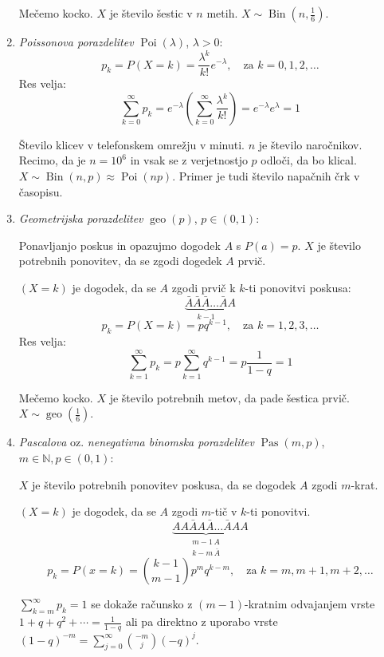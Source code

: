 \documentclass[12pt]{book}
\def\s{\vspace{10pt}}
\theoremstyle{definition}
\theoremstyle{plain}
\theoremstyle{plain}
\theoremstyle{plain}
\theoremstyle{remark}
\begin{document}
\begin{enumerate}
    \begin{zgled}
        Mečemo kocko. $X$ je število šestic v $n$ metih. $X \sim \operatorname{Bin}(n, \frac{1}{6})$.
    \end{zgled}
    \item \emph{Poissonova porazdelitev} $\operatorname{Poi}(\lambda)$, $\lambda > 0$:
    $$
    p_k=P(X=k)=\frac{\lambda^k}{k !} e^{-\lambda}, \quad \text{za } k=0,1,2, \ldots
    $$
    Res velja: 
    $$
    \sum_{k=0}^{\infty} p_k=e^{-\lambda} \left(\sum_{k=0}^{\infty} \frac{\lambda^k}{k !}\right)=e^{-\lambda} e^\lambda=1
    $$
    \begin{zgled}
        Število klicev v telefonskem omrežju v minuti. $n$ je število naročnikov. Recimo, da je $n=10^6$ in vsak se z verjetnostjo $p$ odloči, da bo klical. $X \sim \operatorname{Bin}(n,p)\approx \operatorname{Poi}(np)$. Primer je tudi število napačnih črk v časopisu. 
    \end{zgled}
    \item \emph{Geometrijska porazdelitev} $\operatorname{geo}(p)$, $p \in (0,1)$:
    
    Ponavljanjo poskus in opazujmo dogodek $A$ s $P(a) = p$. $X$ je število potrebnih ponovitev, da se zgodi dogedek $A$ prvič. 

    $(X=k)$ je dogodek, da se $A$ zgodi prvič k $k$-ti ponovitvi poskusa:
    $$
    \underbrace{\bar A\bar A\bar A \ldots \bar A}_{k-1}A
    $$
    $$
    p_k=P(X=k)=p  q^{k-1}, \quad \text{za }k=1, 2, 3, \ldots
    $$
    Res velja: 
    $$
    \sum_{k=1}^{\infty} p_k=p \sum_{k=1}^{\infty} q^{k-1}=p \frac{1}{1-q}=1
    $$
    \begin{zgled}
        Mečemo kocko. $X$ je število potrebnih metov, da pade šestica prvič. $X \sim \operatorname{geo}(\frac{1}{6})$.
    \end{zgled}
    \item \emph{Pascalova} oz. \emph{nenegativna binomska porazdelitev} $\operatorname{Pas}(m,p)$, $m \in \mathbb{N}, p \in (0,1)$:
    
    $X$ je število potrebnih ponovitev poskusa, da se dogodek $A$ zgodi $m$-krat.

    $(X=k)$ je dogodek, da se $A$ zgodi $m$-tič v $k$-ti ponovitvi.
    $$
    \underbrace{A A \bar A A \bar A \ldots \bar A A}_{\substack{m-1 \, A \\ k-m \, \bar A}}A
    $$
    $$
    p_k=P(x=k)=\binom{k-1}{m-1} p^m q^{k-m}, \quad \text{za } k=m, m+1, m+2, \ldots
    $$

    $\sum_{k=m}^{\infty} p_k = 1$ se dokaže računsko z $(m-1)$-kratnim odvajanjem vrste $1+q+q^2+ \cdots = \frac{1}{1-q}$ ali pa direktno z uporabo vrste $(1-q)^{-m}=\sum_{j=0}^{\infty}\binom{-m}{j} (-q)^j$. \s
    

\end{enumerate}
\end{document}
